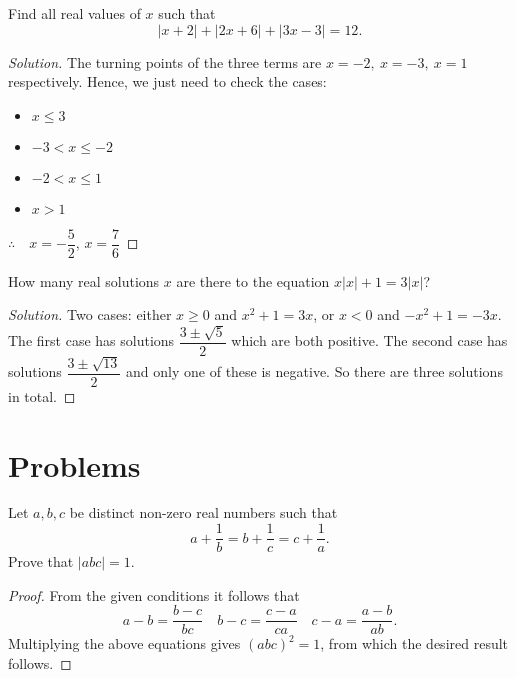 \begin{exmp}{}{}
Find all real values of $x$ such that \[ |x+2| + |2x+6| + |3x-3| = 12. \] \end{exmp} 

\begin{proof}[Solution]
The turning points of the three terms are $x = -2,\:x = -3,\:x = 1$ respectively. Hence, we just need to check the cases:
\begin{itemize}
    \item $x \le 3$
    \item $-3< x \le -2$
    \item $-2 < x \le 1$
    \item $x > 1$
\end{itemize}

$\therefore\quad x = -\dfrac{5}{2}$, $x = \dfrac{7}{6}$
\end{proof}

\begin{exmp}{}{}
How many real solutions $x$ are there to the equation $x|x|+1=3|x|$?
\end{exmp}

\begin{proof}[Solution]
Two cases: either $x \ge 0$ and $x^2 + 1 = 3x$, or $x < 0$ and $-x^2 + 1 = -3x$. The first case has solutions $\dfrac{3\pm\sqrt{5}}{2}$ which are both positive. The second case has solutions $\dfrac{3\pm\sqrt{13}}{2}$ and only one of these is negative. So there are three solutions in total.
\end{proof}
\pagebreak

\section*{Problems}
\begin{prbm}
Let $a, b, c$ be distinct non-zero real numbers such that
\[ a+\frac{1}{b}=b+\frac{1}{c}=c+\frac{1}{a}. \]
Prove that $|abc|=1$.
\end{prbm}

\begin{proof}
From the given conditions it follows that
\[ a-b=\frac{b-c}{bc} \quad b-c=\frac{c-a}{ca} \quad c-a=\frac{a-b}{ab}. \]
Multiplying the above equations gives $(abc)^2=1$, from which the desired result follows.
\end{proof}
\pagebreak

